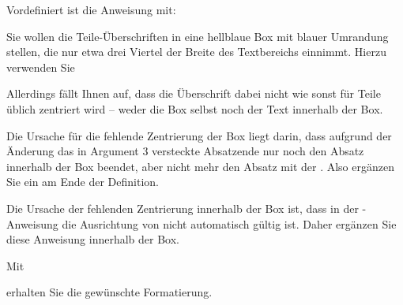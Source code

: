 Vordefiniert ist die Anweisung mit:
\begin{lstcode}
  \newcommand{\partlineswithprefixformat}[3]{#2#3}
\end{lstcode}
\iffalse bisher eher spartanisch.\fi%

\begin{Example}
  Sie wollen die Teile-Überschriften in eine hellblaue Box mit blauer
  Umrandung stellen, die nur etwa drei Viertel der Breite des Textbereichs
  einnimmt. Hierzu verwenden Sie
  Allerdings fällt Ihnen auf, dass die Überschrift dabei nicht wie sonst
  für Teile üblich zentriert wird -- weder die Box selbst noch der Text
  innerhalb der Box.

  Die Ursache für die fehlende Zentrierung der Box liegt
  darin, dass aufgrund der Änderung das in Argument 3 versteckte Absatzende
  nur noch den Absatz innerhalb der Box beendet, aber nicht mehr den Absatz mit
  der . Also ergänzen Sie ein  am Ende der Definition.

  Die Ursache der fehlenden Zentrierung innerhalb der Box ist, dass in der
  -Anweisung die Ausrichtung von
   nicht automatisch gültig ist. Daher
  ergänzen Sie diese Anweisung innerhalb der Box.

  Mit
  erhalten Sie die gewünschte Formatierung.
\end{Example}


